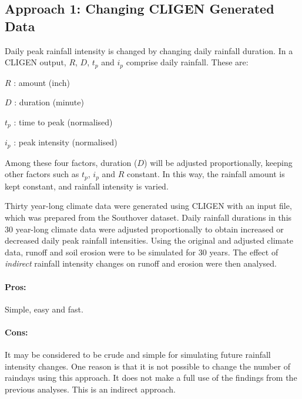 
\subsection{Approach 1: Changing CLIGEN Generated Data}
\label{sec:MethodOne}

Daily peak rainfall intensity is changed by changing daily rainfall duration.
In a CLIGEN output, $R$, $D$, $t_p$ and $i_p$ comprise daily rainfall. These
are:
\begin{itemize*}
  \item $R$ : amount (inch)
  \item $D$ : duration (minute)
  \item $t_p$ : time to peak (normalised)
  \item $i_p$ : peak intensity (normalised)
\end{itemize*}
Among these four factors, duration ($D$) will be adjusted proportionally,
keeping other factors such as $t_p$, $i_p$ and $R$ constant. In this way, the
rainfall amount is kept constant, and rainfall intensity is varied.

Thirty year-long climate data were generated using CLIGEN with an input file,
which was prepared from the Southover dataset. Daily rainfall durations in this
30 year-long climate data were adjusted proportionally to obtain increased or
decreased daily peak rainfall intensities. Using the original and adjusted
climate data, runoff and soil erosion were to be simulated for 30 years. The
effect of \textit{indirect} rainfall intensity changes on runoff and erosion
were then analysed.

\paragraph{Pros:}
\label{sec:ProsMethodOne}
Simple, easy and fast.
\paragraph{Cons:}
\label{sec:ConsMethodOne}
It may be considered to be crude and simple for simulating future rainfall
intensity changes. One reason is that it is not possible to change the number
of raindays using this approach. It does not make a full use of the findings
from the previous analyses. This is an indirect approach.

